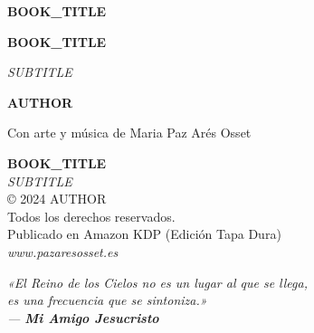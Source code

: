 \documentclass[12pt,twoside,openright]{book}
\begin{document}
\frontmatter

\thispagestyle{empty}
\vspace*{5cm}
\begin{center}
    {\LARGE \textbf{{{BOOK_TITLE}}}}
\end{center}
\cleardoublepage

\begin{titlepage}
    \centering
    \vspace*{2cm}
    {\Huge \textbf{{{BOOK_TITLE}}} \par}
    \vspace{0.8cm}
    {\Large \textit{{{SUBTITLE}}} \par}
    \vfill
    {\large \textbf{{{AUTHOR}}} \par}
    \vspace{0.5cm}
    {\small Con arte y música de Maria Paz Arés Osset \par}
    \vspace*{2cm}
\end{titlepage}
\cleardoublepage

\thispagestyle{empty}
\vspace*{11cm}
\begin{center}
    \small
    \textbf{{{BOOK_TITLE}}} \\
    \textit{{{SUBTITLE}}} \\
    \vspace{0.5cm}
    © 2024 {{AUTHOR}} \\
    Todos los derechos reservados. \\
    Publicado en Amazon KDP (Edición Tapa Dura) \\
    \vspace{0.3cm}
    \textit{www.pazaresosset.es}
\end{center}
\cleardoublepage

\thispagestyle{empty}
\vspace*{6cm}
\begin{center}
    \itshape
    «El Reino de los Cielos no es un lugar al que se llega,\\
    es una frecuencia que se sintoniza.»\\
    \vspace{1cm}
    \normalfont --- \textbf{Mi Amigo Jesucristo}
\end{center}
\cleardoublepage

\tableofcontents
\cleardoublepage
\end{document}
